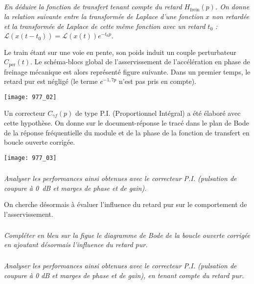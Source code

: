 \subparagraph{}
\textit{En déduire la fonction de transfert tenant compte du retard $H_{\text{frein}}( p)$. On donne la relation suivante entre la transformée de Laplace d’une fonction $x$ non retardée et la transformée de Laplace de cette même fonction avec un
retard $t_0$ : $\mathcal{L}\left( x(t - t_0)\right)= \mathcal{L}\left( x(t)\right)e^{-t_0 p}$.}
\ifprof
\begin{corrige}
\end{corrige}
\else
\fi

Le train étant sur une voie en pente, son poids induit un couple perturbateur $C_{\text{per}}(t)$. Le schéma-blocs global
de l’asservissement de l’accélération en phase de freinage mécanique est alors représenté figure suivante.
Dans un premier temps, le retard pur est négligé (le terme $e^{-1,7 p}$ n’est pas pris en compte). 

\begin{center}
\texttt{[image: 977\_02]}%
\end{center}

Un correcteur $C_{\gamma f}(p)$ de type P.I. (Proportionnel Intégral) a été élaboré avec cette hypothèse. On donne sur
le document-réponse le tracé dans le plan de Bode de la réponse fréquentielle du module et de la phase de
la fonction de transfert en boucle ouverte corrigée.

\begin{center}
\texttt{[image: 977\_03]}%
\end{center}



\subparagraph{}
\textit{Analyser les performances ainsi obtenues avec le correcteur P.I. (pulsation de coupure à
\SI{0}{dB} et marges de phase et de gain).}
\ifprof
\begin{corrige}
\end{corrige}
\else
\fi

On cherche désormais à évaluer l’influence du retard pur sur le comportement de l’asservissement.

\subparagraph{}
\textit{Compléter en bleu sur la figue le diagramme de Bode de la boucle ouverte
corrigée en ajoutant désormais l’influence du retard pur.}
\ifprof
\begin{corrige}
\end{corrige}
\else
\fi

\subparagraph{}
\textit{Analyser les performances ainsi obtenues avec le correcteur P.I. (pulsation de coupure à 0 dB et
marges de phase et de gain), en tenant compte du retard pur.}
\ifprof
\begin{corrige}
\end{corrige}
\else
\fi

